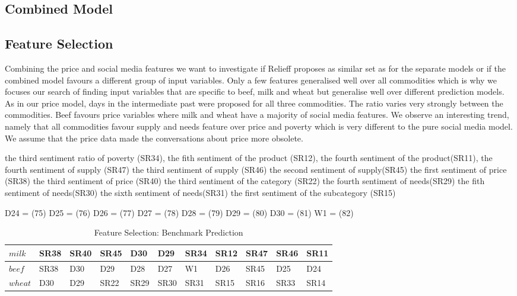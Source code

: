 \subsection{Combined Model}


\subsection{Feature Selection}

Combining the price and social media features we want to investigate if Relieff proposes as similar set as for the separate models or if the combined model favours a different group of input variables. Only a few features generalised well over all commodities which is why we focuses our search of finding input variables that are specific to beef, milk and wheat but generalise well over different prediction models. As in our price model, days in the intermediate past were proposed for all three commodities. The ratio varies very strongly between the commodities. Beef favours price variables where milk and wheat have a majority of social media features. We observe an interesting trend, namely that all commodities favour supply and needs feature over price and poverty which is very different to the pure social media model. We assume that the price data made the conversations about price more obsolete. 


the third sentiment ratio of poverty (SR34), 
the fith sentiment of the product (SR12), 
the fourth sentiment of the product(SR11), 
the fourth sentiment of supply (SR47)
the third sentiment of supply (SR46)
the second sentiment of supply(SR45)
the first sentiment of price (SR38)
the third sentiment of price (SR40)
the third sentiment of the category (SR22)
the fourth sentiment of needs(SR29)
the fith sentiment of needs(SR30)
the sixth sentiment of needs(SR31)
the first sentiment of the subcategory (SR15)


D24 = (75)
D25 = (76)
D26 = (77)
D27 = (78)
D28 = (79)
D29 = (80)
D30 = (81)
W1 = (82)





\begin{table}[H]
\centering
\begin{tabular}{ |p{2cm}|p{1cm}|p{1cm}|p{1cm}|p{1cm}|p{1cm}|p{1cm}|p{1cm}|p{1cm}|p{1cm}| p{1cm}|  }
\hline
$milk$ & SR38 & SR40 & SR45 & D30 & D29 &  SR34 & SR12 & SR47 & SR46 & SR11 \\
\hline
$beef$ & SR38 & D30 & D29 & D28 & D27 &  W1 & D26 & SR45 & D25 & D24 \\
\hline
$wheat$ & D30 & D29 & SR22 & SR29 & SR30 & SR31 & SR15 & SR16 & SR33 & SR14 \\
\hline
\end{tabular}
\caption{Feature Selection: Benchmark Prediction}
\label{tab:feat_mod3}
\end{table}









